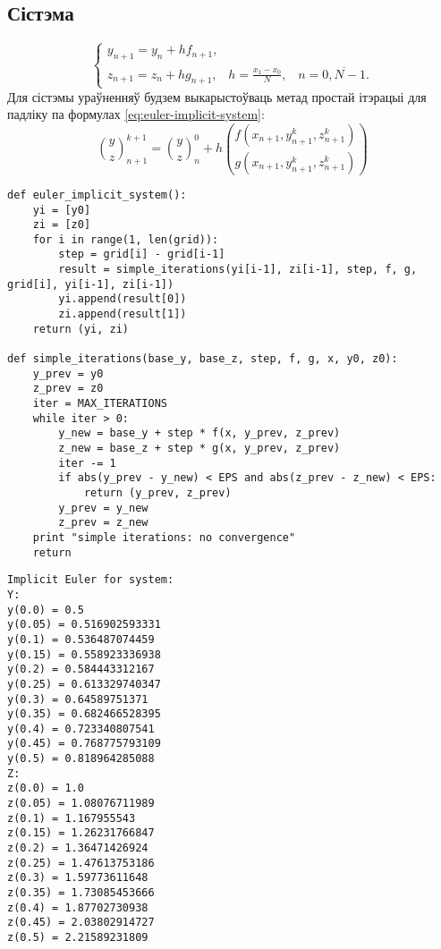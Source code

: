 \subsection*{Сістэма}
\begin{equation}
    \begin{cases} \label{eq:euler-implicit-system}
        y_{n+1} = y_n + hf_{n+1}, \\
        z_{n+1} = z_n + hg_{n+1}, \hspace{10pt} h = \frac{x_1-x_0}{N}, \hspace{10pt} n = \overline{0, N-1}.
    \end{cases}
\end{equation}
Для сістэмы ураўненняў будзем выкарыстоўваць метад простай ітэрацыі для падліку па формулах \eqref{eq:euler-implicit-system}:
\begin{equation} \label{eq:simple-iterations-system}
    \binom{y}{z}_{n+1}^{k+1} = \binom{y}{z}_{n}^{0} + h\binom{f(x_{n+1}, y_{n+1}^{k}, z_{n+1}^{k})}{g(x_{n+1}, y_{n+1}^{k}, z_{n+1}^{k})}
\end{equation}

{\small
\begin{verbatim}
def euler_implicit_system():
    yi = [y0]
    zi = [z0]
    for i in range(1, len(grid)):
        step = grid[i] - grid[i-1]
        result = simple_iterations(yi[i-1], zi[i-1], step, f, g, grid[i], yi[i-1], zi[i-1])
        yi.append(result[0])
        zi.append(result[1])
    return (yi, zi)

def simple_iterations(base_y, base_z, step, f, g, x, y0, z0):
    y_prev = y0
    z_prev = z0
    iter = MAX_ITERATIONS
    while iter > 0:
        y_new = base_y + step * f(x, y_prev, z_prev)
        z_new = base_z + step * g(x, y_prev, z_prev)
        iter -= 1
        if abs(y_prev - y_new) < EPS and abs(z_prev - z_new) < EPS:
            return (y_prev, z_prev)
        y_prev = y_new
        z_prev = z_new
    print "simple iterations: no convergence"
    return
\end{verbatim}
}

{\small
\begin{verbatim}
Implicit Euler for system:
Y:
y(0.0) = 0.5
y(0.05) = 0.516902593331
y(0.1) = 0.536487074459
y(0.15) = 0.558923336938
y(0.2) = 0.584443312167
y(0.25) = 0.613329740347
y(0.3) = 0.64589751371
y(0.35) = 0.682466528395
y(0.4) = 0.723340807541
y(0.45) = 0.768775793109
y(0.5) = 0.818964285088
Z:
z(0.0) = 1.0
z(0.05) = 1.08076711989
z(0.1) = 1.167955543
z(0.15) = 1.26231766847
z(0.2) = 1.36471426924
z(0.25) = 1.47613753186
z(0.3) = 1.59773611648
z(0.35) = 1.73085453666
z(0.4) = 1.87702730938
z(0.45) = 2.03802914727
z(0.5) = 2.21589231809
\end{verbatim}
}

